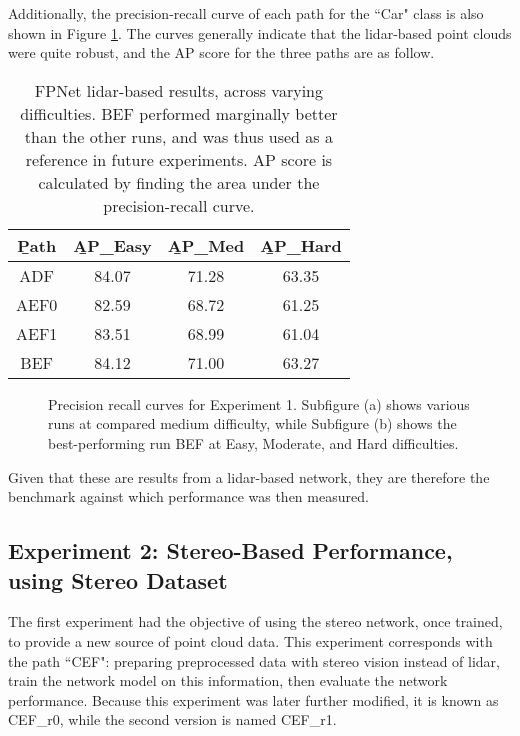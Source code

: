 Additionally, the precision-recall curve of each path for the ``Car" class is also shown in Figure \ref{fpnet_pr1}. The curves generally indicate that the lidar-based point clouds were quite robust, and the AP score for the three paths are as follow.

\begin{table}[ht]
	\centering
	\caption{FPNet lidar-based results, across varying difficulties. BEF performed marginally better than the other runs, and was thus used as a reference in future experiments. AP score is calculated by finding the area under the precision-recall curve.}
	\begin{tabular}{|c|c|c|c|}
		\hline
		\b{Path} & \b{AP\_Easy} & \b{AP\_Med} & \b{AP\_Hard} \\ \hline
		  ADF    &    84.07     &    71.28    &    63.35     \\ \hline
		  AEF0   &    82.59     &    68.72    &    61.25     \\ \hline
		  AEF1   &    83.51     &    68.99    &    61.04     \\ \hline
		  BEF    &    84.12     &    71.00    &    63.27     \\ \hline
	\end{tabular}
	\label{fpnet_ap1}
\end{table}


\begin{figure}[H]
	\centering
	\caption{Precision recall curves for Experiment 1. Subfigure (a) shows various runs at compared medium difficulty, while Subfigure (b) shows the best-performing run BEF at Easy, Moderate, and Hard difficulties.}
	\label{fpnet_pr1}
\end{figure}




Given that these are results from a lidar-based network, they are therefore the benchmark against which performance was then measured. 

\subsection{Experiment 2: Stereo-Based Performance, using Stereo Dataset}
The first experiment had the objective of using the stereo network, once trained, to provide a new source of point cloud data. This experiment corresponds with the path ``CEF": preparing preprocessed data with stereo vision instead of lidar, train the network model on this information, then evaluate the network performance. Because this experiment was later further modified, it is known as CEF\_r0, while the second version is named CEF\_r1. 


